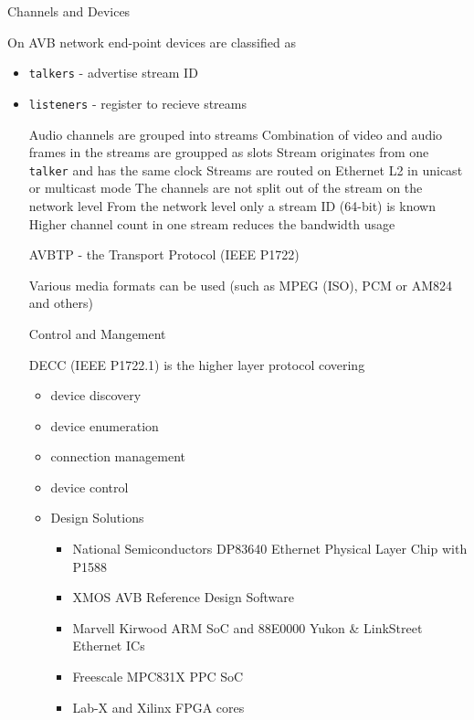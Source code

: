 
{ Channels and Devices }

On AVB network end-point devices are classified as
\begin{itemize}
	\item \texttt{talkers} - advertise stream ID
	\item \texttt{listeners} - register to recieve streams
\begin{itemize}

Audio channels are grouped into streams
Combination of video and audio frames in the streams are groupped as slots
Stream originates from one \texttt{talker} and has the same clock
Streams are routed on Ethernet L2 in unicast or multicast mode
The channels are not split out of the stream on the network level
From the network level only a stream ID (64-bit) is known
Higher channel count in one stream reduces the bandwidth usage

{  AVBTP - the Transport Protocol (IEEE P1722) }


Various media formats can be used
(such as MPEG (ISO), PCM or AM824 and others)

{ Control and Mangement }

DECC (IEEE P1722.1) is the higher layer protocol covering
\begin{itemize}
	\item device discovery
	\item device enumeration
	\item connection management
	\item device control 
\end{itemize}


\begin{itemize}
	\item Design Solutions
	\begin{itemize}
		\item National Semiconductors DP83640 Ethernet Physical Layer Chip with P1588 
		\item XMOS AVB Reference Design Software
		\item Marvell Kirwood ARM SoC and 88E0000 Yukon \& LinkStreet Ethernet ICs
		\item Freescale MPC831X PPC SoC
		\item Lab-X and Xilinx FPGA cores
	\end{itemize}
\end{itemize}


\end{itemize}
\end{itemize}
